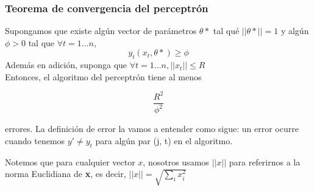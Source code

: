\subsubsection{Teorema de convergencia del perceptrón}

\theoremstyle{plain}
\begin{theorem}
Supongamos que existe algún vector de parámetros $\theta*$ tal qué
$||\theta*|| = 1$ y algún $\phi > 0$ tal que $\forall t = 1 \dots n$,
\begin{equation*}
  y_t(x_t, \theta*) \geq \phi
\end{equation*}
Además en adición, suponga que $\forall t = 1 \dots n, ||x_t|| \leq
R$\\
Entonces, el algoritmo del perceptrón tiene al menos

\begin{equation*}
  \frac{R^2}{\phi^2}
\end{equation*}

errores. La definición de error la vamos a entender como sigue: un
error ocurre cuando tenemos $y' \neq y_t$ para algún par (j, t) en el
algoritmo.
\end{theorem}

Notemos que para cualquier vector $x$, nosotros usamos $||x||$ para
referirnos a la norma Euclidiana de \textbf{x}, es decir,
$||x||=\sqrt{\displaystyle\sum_ix_i^2}$

